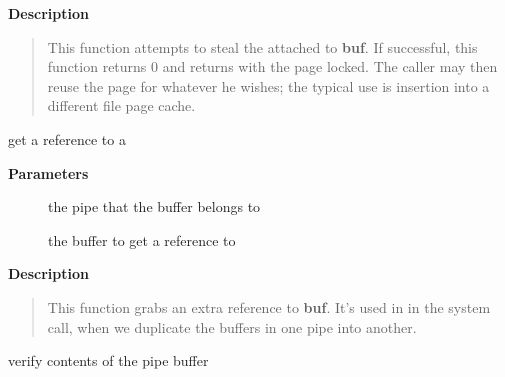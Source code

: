 \documentclass[a4paper,8pt,english]{sphinxmanual}
\begin{document}
\textbf{Description}
\begin{quote}

This function attempts to steal the  attached to
\textbf{buf}. If successful, this function returns 0 and returns with
the page locked. The caller may then reuse the page for whatever
he wishes; the typical use is insertion into a different file
page cache.
\end{quote}

\begin{fulllineitems}
\label{filesystems/index:c.generic_pipe_buf_get}
get a reference to a {\hyperref[filesystems/index:c.pipe_buffer]{\emph{}}}

\end{fulllineitems}


\textbf{Parameters}
\begin{description}
\item[{}] \leavevmode
the pipe that the buffer belongs to

\item[{}] \leavevmode
the buffer to get a reference to

\end{description}

\textbf{Description}
\begin{quote}

This function grabs an extra reference to \textbf{buf}. It's used in
in the  system call, when we duplicate the buffers in one
pipe into another.
\end{quote}

\begin{fulllineitems}
\label{filesystems/index:c.generic_pipe_buf_confirm}
verify contents of the pipe buffer

\end{fulllineitems}
\end{document}

